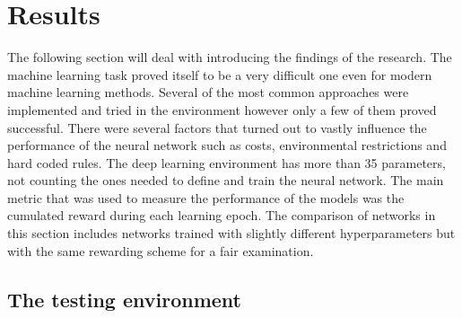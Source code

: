 \documentclass[
]{elteikthesis}[2023/04/10]
\begin{document}
\newpage{}

\chapter{Results}

The following section will deal with introducing the findings of the
research. The machine learning task proved itself to be a very difficult
one even for modern machine learning methods. Several of the most
common approaches were implemented and tried in the environment however
only a few of them proved successful. There were several factors that
turned out to vastly influence the performance of the neural network
such as costs, environmental restrictions and hard coded rules. The
deep learning environment has more than 35 parameters, not counting
the ones needed to define and train the neural network. The main metric
that was used to measure the performance of the models was the cumulated
reward during each learning epoch. The comparison of networks in this
section includes networks trained with slightly different hyperparameters
but with the same rewarding scheme for a fair examination.

\section{The testing environment}
\end{document}
